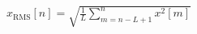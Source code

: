 \documentclass[preview]{standalone}
\begin{document}
\begin{align*}
x_{\mathrm{RMS}}[n] = \sqrt{ \frac{1}{L} \sum_{m=n-L+1}^{n} x^2[m] }
\end{align*}
\end{document}
